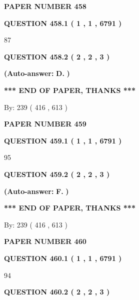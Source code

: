\documentclass[12pt]{article}
\begin{document}
   
\newpage 
\setcounter{page}{ 
   458001 } 
   
   
 {\textbf{ \Large{ PAPER NUMBER  458  }}}
   
   
   
   
  
  
{\textbf{\large{QUESTION
458.1 
 ( 1 , 1 , 6791 )
}}}

87
  
  
{\textbf{\large{QUESTION
458.2 
 ( 2 , 2 , 3 )
}}}
 
 
{\textbf{(Auto-answer:}}
{\textbf{\large{
D.}}}
{\textbf{)}}
 
 
   
   
   
   
\vspace{1.0in} 
{\textbf{\large{ *** END OF PAPER, THANKS *** }}} 
   
   
\hspace{1.0in} By: 
 239 ( 416 ,  613 )
   
   
   
   
\newpage 
\setcounter{page}{ 
   459001 } 
   
   
 {\textbf{ \Large{ PAPER NUMBER  459  }}}
   
   
   
   
  
  
{\textbf{\large{QUESTION
459.1 
 ( 1 , 1 , 6791 )
}}}

95
  
  
{\textbf{\large{QUESTION
459.2 
 ( 2 , 2 , 3 )
}}}
 
 
{\textbf{(Auto-answer:}}
{\textbf{\large{
F.}}}
{\textbf{)}}
 
 
   
   
   
   
\vspace{1.0in} 
{\textbf{\large{ *** END OF PAPER, THANKS *** }}} 
   
   
\hspace{1.0in} By: 
 239 ( 416 ,  613 )
   
   
   
   
\newpage 
\setcounter{page}{ 
   460001 } 
   
   
 {\textbf{ \Large{ PAPER NUMBER  460  }}}
   
   
   
   
  
  
{\textbf{\large{QUESTION
460.1 
 ( 1 , 1 , 6791 )
}}}

94
  
  
{\textbf{\large{QUESTION
460.2 
 ( 2 , 2 , 3 )
}}}
 
\end{document}
